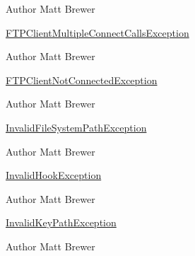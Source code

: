 \begin{DoxyAuthor}{Author}
Matt Brewer
\end{DoxyAuthor}
\hyperlink{class_f_t_p_client_multiple_connect_calls_exception}{FTPClientMultipleConnectCallsException}

\begin{DoxyAuthor}{Author}
Matt Brewer
\end{DoxyAuthor}
\hyperlink{class_f_t_p_client_not_connected_exception}{FTPClientNotConnectedException}

\begin{DoxyAuthor}{Author}
Matt Brewer
\end{DoxyAuthor}
\hyperlink{class_invalid_file_system_path_exception}{InvalidFileSystemPathException}

\begin{DoxyAuthor}{Author}
Matt Brewer
\end{DoxyAuthor}
\hyperlink{class_invalid_hook_exception}{InvalidHookException}

\begin{DoxyAuthor}{Author}
Matt Brewer
\end{DoxyAuthor}
\hyperlink{class_invalid_key_path_exception}{InvalidKeyPathException}

\begin{DoxyAuthor}{Author}
Matt Brewer 
\end{DoxyAuthor}
